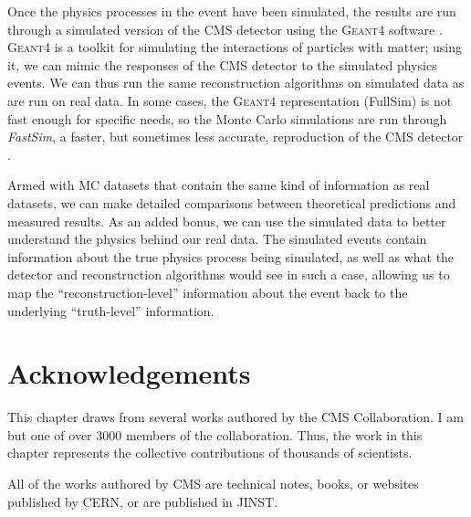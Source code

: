 Once the physics processes in the event have been simulated, the
results are run through a simulated version of the CMS detector using
the \textsc{Geant4} software \cite{geant}. \textsc{Geant4} is a
toolkit for simulating the interactions of particles with matter;
using it, we can mimic the responses of the CMS detector to the
simulated physics events. We can thus run the same reconstruction
algorithms on simulated data as are run on real data. In some cases,
the \textsc{Geant4} representation (FullSim) is not fast enough
for specific needs, so the Monte Carlo simulations are run through
\emph{FastSim}, a faster, but sometimes less accurate, reproduction of
the CMS detector \cite{fastsim}.

Armed with MC datasets that contain the same kind of information as
real datasets, we can make detailed comparisons between theoretical
predictions and measured results. As an added bonus, we can use the
simulated data to better understand the physics behind our real
data. The simulated events contain information about the true physics
process being simulated, as well as what the detector and
reconstruction algorithms would see in such a case, allowing us to
map the ``reconstruction-level'' information about the event back to
the underlying ``truth-level'' information.

\section{Acknowledgements}
\label{sec:hardware:acknowledgements}

This chapter draws from several works authored by the CMS
Collaboration. I am but one of over 3000 members of the
collaboration. Thus, the work in this chapter represents the
collective contributions of thousands of scientists.

All of the works authored by CMS are technical notes, books, or
websites published by CERN, or are published in JINST.

